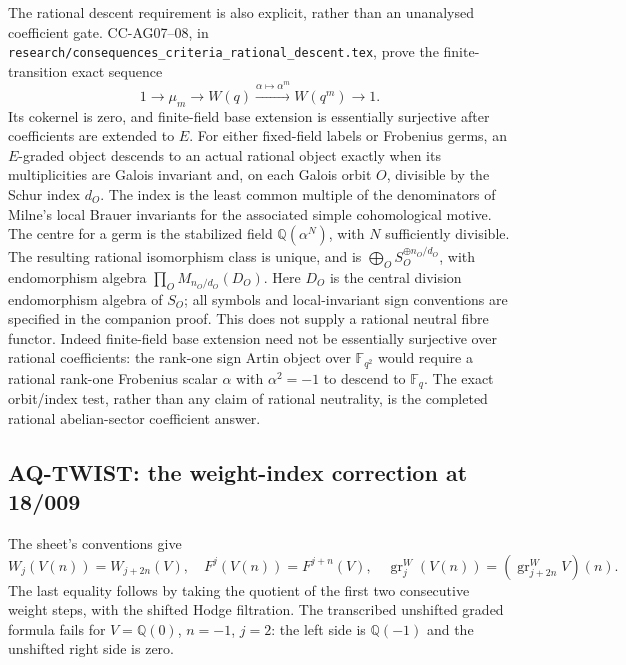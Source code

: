 The rational descent requirement is also explicit, rather than an
unanalysed coefficient gate. CC-AG07--08, in
\texttt{research/consequences\_criteria\_rational\_descent.tex},
prove the finite-transition exact sequence
\[
 1\longrightarrow\mu_m\longrightarrow W(q)
  \xrightarrow{\alpha\mapsto\alpha^m}W(q^m)
  \longrightarrow1.
\]
Its cokernel is zero, and finite-field base extension is
essentially surjective after coefficients are extended to $E$.
For either fixed-field labels or Frobenius germs, an $E$-graded
object descends to an actual rational object exactly when its
multiplicities are Galois invariant and, on each Galois orbit
$O$, divisible by the Schur index $d_O$. The index is the least
common multiple of the denominators of Milne's local Brauer
invariants for the associated simple cohomological motive.
The centre for a germ is the stabilized field
$\mathbb Q(\alpha^N)$, with $N$ sufficiently divisible.
The resulting rational isomorphism class is unique, and is
$\bigoplus_O S_O^{\oplus n_O/d_O}$, with endomorphism algebra
$\prod_O M_{n_O/d_O}(D_O)$. Here $D_O$ is the central division
endomorphism algebra of $S_O$; all symbols and local-invariant
sign conventions are specified in the companion proof.
This does not supply a rational neutral fibre functor.
Indeed finite-field base extension need not be essentially
surjective over rational coefficients: the rank-one sign Artin
object over $\mathbb F_{q^2}$ would require a rational rank-one
Frobenius scalar $\alpha$ with $\alpha^2=-1$ to descend to
$\mathbb F_q$. The exact orbit/index test, rather than any
claim of rational neutrality, is the completed rational
abelian-sector coefficient answer.

\subsection{AQ-TWIST: the weight-index correction at 18/009}
The sheet's conventions give
\[
 W_j(V(n))=W_{j+2n}(V),\quad F^j(V(n))=F^{j+n}(V),\quad
 \operatorname{gr}^W_j(V(n))
 =(\operatorname{gr}^W_{j+2n}V)(n).                             \tag{AQ.6}
\]
The last equality follows by taking the quotient of the
first two consecutive weight steps, with the shifted Hodge
filtration. The transcribed unshifted graded formula fails
for $V=\mathbb Q(0)$, $n=-1$, $j=2$: the left side is
$\mathbb Q(-1)$ and the unshifted right side is zero.

